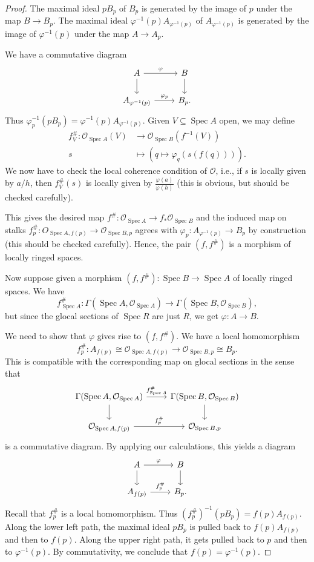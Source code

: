 \documentclass[a4paper]{amsbook}
\theoremstyle{definition}
\DeclareMathOperator\Spec{Spec}
\begin{document}
\begin{proof}[Proof]
The maximal ideal $pB_p$ of $B_p$ is generated by the image of $p$ under the map
$B\to B_p$. The maximal ideal $\varphi^{-1}(p)A_{\varphi^{-1}(p)}$ of $A_{\varphi^{-1}(p)}$ is generated by the image
of $\varphi^{-1}(p)$ under the map $A\to A_p$.

We have a commutative diagram
\[\begin{tikzcd}
	A\ar[r, "\varphi"]\ar[d] & B\ar[d]\\
	A_{\varphi^{-1}(p)}\ar[r, "\varphi_p"] & B_p.
\end{tikzcd}\]
Thus $\varphi_p^{-1}(pB_p) = \varphi^{-1}(p)A_{\varphi^{-1}(p)}$.
Given $V \subseteq \Spec A$ open, we may define
\begin{align*}
	f^\#_V\colon \mathcal{O}_{\Spec A}(V)&\to \mathcal{O}_{\Spec B}(f^{-1}(V))\\
	s&\mapsto (q\mapsto \varphi_q(s(f(q)))).
\end{align*}
We now have to check the local coherence condition of $\mathcal{O}$, i.e.,
if $s$ is locally given by $a/h$, then $f^\#_V(s)$ is locally given by
$\frac{\varphi(a)}{\varphi(h)}$ (this is obvious, but should be checked carefully).

This gives the desired map $f^\#\colon \mathcal{O}_{\Spec A}\to f_*\mathcal{O}_{\Spec B}$
and the induced map on stalks $f^\#_p\colon O_{\Spec A, f(p)}\to \mathcal{O}_{\Spec B, p}$
agrees with $\varphi_p\colon A_{\varphi^{-1}(p)}\to B_p$ by construction (this should
be checked carefully). Hence,
the pair $(f, f^\#)$ is a morphism of locally ringed spaces.

Now suppose given a morphism $(f, f^\#)\colon \Spec B\to \Spec A$ of locally
ringed spaces. We have
\[ f^\#_{\Spec A}\colon \Gamma(\Spec A, \mathcal{O}_{\Spec A}) \to \Gamma(\Spec B, \mathcal{O}_{\Spec B}), \]
but since the glocal sections of $\Spec R$ are just $R$, we get $\varphi\colon A\to B$.

We need to show that $\varphi$ gives rise to $(f, f^\#)$. We have a local homomorphism
\[ f_p^\#\colon A_{f(p)} \cong \mathcal{O}_{\Spec A, f(p)} \to \mathcal{O}_{\Spec B, p}\cong B_p. \]
This is compatible with the corresponding map on glocal sections in the sense that
\[\begin{tikzcd}
	\Gamma(\Spec A, \mathcal{O}_{\Spec A})\ar[d]\ar[r, "f^\#_{\Spec A}"] & \Gamma(\Spec B, \mathcal{O}_{\Spec B})\ar[d]\\
	\mathcal{O}_{\Spec A, f(p)}\ar[r, "f_p^\#"] & \mathcal{O}_{\Spec B, p}
\end{tikzcd}\]
is a commutative diagram. By applying our calculations, this yields a diagram
\[\begin{tikzcd}
	A\ar[r, "\varphi"]\ar[d] & B\ar[d]\\
	A_{f(p)}\ar[r, "f_p^\#"] & B_p.
\end{tikzcd}\]
Recall that $f_p^\#$ is a local homomorphism. Thus $(f_p^\#)^{-1}(pB_p) = f(p)A_{f(p)}	$.
Along the lower left path, the maximal ideal $pB_p$ is pulled back to $f(p)A_{f(p)}$ and
then to $f(p)$. Along the upper right path, it gets pulled back to $p$ and then to $\varphi^{-1}(p)$.
By commutativity, we conclude that $f(p) = \varphi^{-1}(p)$.


\end{proof}
\end{document}
